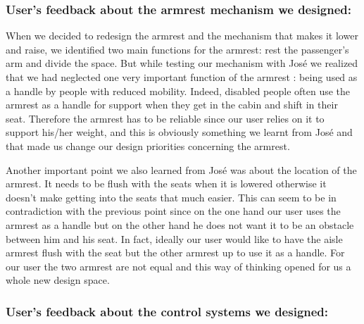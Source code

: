 \subsubsection{User's feedback about the armrest mechanism we designed:}

When we decided to redesign the armrest and the mechanism that makes it lower and raise, we identified two main functions for the armrest: rest the passenger's arm and divide the space. But while testing our mechanism with José we realized that we had neglected one very important function of the armrest : being used as a handle by people with reduced mobility. Indeed, disabled people often use the armrest as a handle for support when they get in the cabin and shift in their seat. Therefore the armrest has to be reliable since our user relies on it to support his/her weight, and this is obviously something we learnt from José and that made us change our design priorities concerning the armrest.

Another important point we also learned from José was about the location of the armrest. It needs to be flush with the seats when it is lowered otherwise it doesn't make getting into the seats that much easier. This can seem to be in contradiction with the previous point since on the one hand our user uses the armrest as a handle but on the other hand he does not want it to be an obstacle between him and his seat. In fact, ideally our user would like to have the aisle armrest flush with the seat but the other armrest up to use it as a handle. For our user the two armrest are not equal and this way of thinking opened for us a whole new design space. 


\subsubsection{User's feedback about the control systems we designed:}

